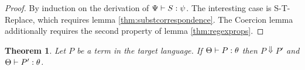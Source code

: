 \documentclass{acm_proc_article-sp}
\newtheorem{thm}{Theorem}
\theoremstyle{definition}
\newcommand{\Lagr}{\mathcal{L}}
\newcommand{\lang}[1]{\Lagr\{#1\}}
\newcommand{\reduces}{ \Rightarrow }
\newcommand{\coerce}[2]{ {\sf rcoerce}[#1](#2)}
\newcommand{\rsconcat}[2]{{\sf rconcat}(#1,#2)} \newcommand{\rconcat}[2]{{\sf rconcat}(#1,#2)} %
\newcommand{\stringin}[1]{{\sf stringin}[#1]}
\renewcommand{\tstr}[1]{{{\sf str}[#1]}}
\newcommand{\lsubst}[3]{{\tt lsubst}(#1,#2,#3)} %
\newcommand{\lreplace}[3]{{\tt lreplace}(#1, #2, #3)}
\newcommand{\err}{\ {\sf err}}
\newcommand{\sreduces}{ \Downarrow }
\begin{document}
\begin{proof}
By induction on the derivation of $\Psi \vdash S : \psi$. The interesting case
is S-T-Replace, which requires lemma \ref{thm:substcorrespondence}. The 
Coercion lemma additionally requires the second property of lemma \ref{thm:regexprops}.

%
%
%
%
\end{proof}

\begin{thm}
  Let $P$ be a term in the target language. If $\Theta \vdash P : \theta$ 
  then $P \sreduces P'$ and $\Theta \vdash P' : \theta$.
\end{thm}
\end{document}
